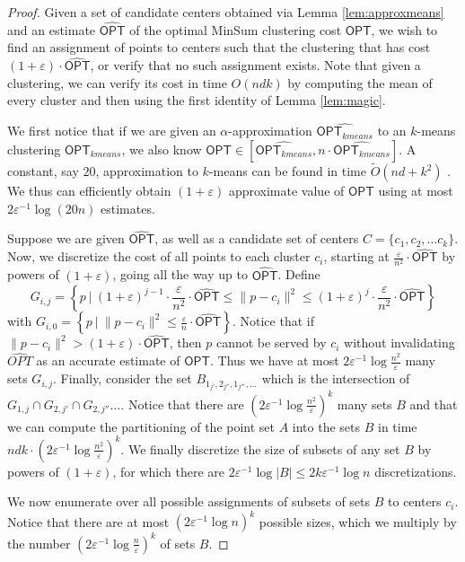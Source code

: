 \documentclass[10pt,a4paper]{amsart}
\def \OPT    {\mdef{\mathsf{OPT}}}
\newcommand{\mdef}[1]{{\ensuremath{#1}}\xspace}  %
\begin{document}
\begin{proof}
Given a set of candidate centers obtained via Lemma \ref{lem:approxmeans} and an estimate $\widehat{\OPT}$ of the optimal MinSum clustering cost $\OPT$, we wish to find an assignment of points to centers such that the clustering that has cost $(1+\varepsilon)\cdot\widehat{\OPT}$, or verify that no such assignment exists.
Note that given a clustering, we can verify its cost in time $O(ndk)$ by computing the mean of every cluster and then using the first identity of Lemma \ref{lem:magic}.

We first notice that if we are given an $\alpha$-approximation $\widehat{\OPT_{kmeans}}$ to an $k$-means clustering $\OPT_{kmeans}$, we also know $\OPT\in \left[\widehat{\OPT_{kmeans}},n\cdot \widehat{\OPT_{kmeans}}\right]$. A constant, say $20$, approximation to $k$-means can be found in time $\tilde{O}(nd + k^2)$ \cite{DraganovSS24}. We thus can efficiently obtain  $(1+\varepsilon)$ approximate value of $\OPT$ using at most $2\varepsilon^{-1}\log(20n)$ estimates.

Suppose we are given $\widehat{\OPT}$, as well as a candidate set of centers $C=\{c_1,c_2,\ldots c_k\}$.
Now, we discretize the cost of all points to each cluster $c_i$, starting at $\frac{\varepsilon}{n^2}\cdot \widehat{\OPT}$ by powers of $(1+\varepsilon)$, going all the way up to $\widehat{\OPT}$. Define 
$$G_{i,j}=\left\{p~|~ (1+\varepsilon)^{j-1} \cdot \frac{\varepsilon}{n^2}\cdot \widehat{\OPT}\leq \|p-c_i\|^2 \leq (1+\varepsilon)^{j} \cdot \frac{\varepsilon}{n^2}\cdot\widehat{\OPT}\right\}$$ 
with $G_{i,0} = \left\{p~|~ \|p-c_i\|^2 \leq \frac{\varepsilon}{ n}\cdot\widehat{\OPT}\right\}$. Notice that if $\|p-c_i\|^2>(1+\varepsilon)\cdot \widehat{\OPT}$, then $p$ cannot be served by $c_i$ without invalidating $\widehat{OPT}$ as an accurate estimate of $\OPT$. Thus we have at most $2\varepsilon^{-1}\log \frac{n^2}{\varepsilon}$ many sets $G_{i,j}$. Finally, consider the set 
$B_{1_{j'},2_{j''},1_{j'''},\ldots }$ which is the intersection of $G_{1,j}\cap G_{2,j'}\cap G_{2,j''}\ldots$.
Notice that there are $\left(2\varepsilon^{-1}\log \frac{n^2}{\varepsilon}\right)^k$ many sets $B$ and that we can compute the partitioning of the point set $A$ into the sets $B$ in time $ndk\cdot \left(2\varepsilon^{-1}\log \frac{n^2}{\varepsilon}\right)^k$.
We finally discretize the size of subsets of any set $B$ by powers of $(1+\varepsilon)$, for which there are $2\varepsilon^{-1}\log |B| \leq 2k\varepsilon^{-1}\log n$ discretizations. 

We now enumerate over all possible assignments of subsets of sets $B$ to centers $c_i$. Notice that there are at most $\left(2\varepsilon^{-1}\log n\right)^k$ possible sizes, which we multiply by the number $\left(2\varepsilon^{-1}\log \frac{n}{\varepsilon}\right)^k$ of sets $B$.


\end{proof}
\end{document}
